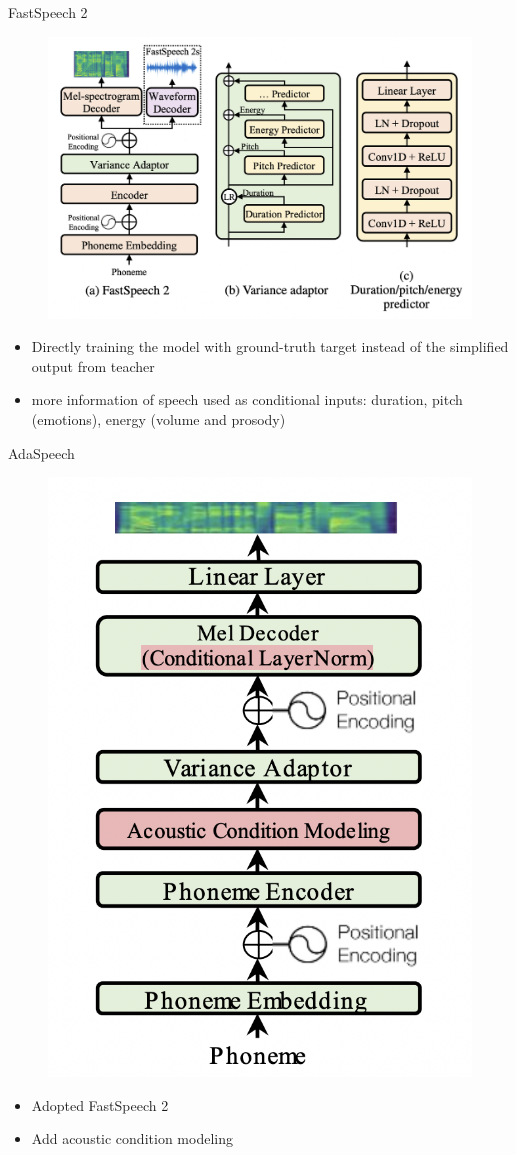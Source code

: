 \begin{frame}{FastSpeech 2}
    \begin{figure}
    	\centering
    	\includegraphics[width=0.72\linewidth]{figs/fastspeech2.png}
    \end{figure}
    \begin{itemize}
        \item Directly training the model with ground-truth target instead of the simplified output from teacher
        \item more information of speech used as conditional inputs: duration, pitch (emotions), energy (volume and prosody)
    \end{itemize}


\end{frame}
\begin{frame}{AdaSpeech}
    \begin{figure}
    	\centering
    	\includegraphics[width=0.4\linewidth]{figs/adaspeech.png}
    \end{figure}
    \begin{itemize}
        \item Adopted FastSpeech 2
        \item Add acoustic condition modeling
    \end{itemize}

\end{frame}
